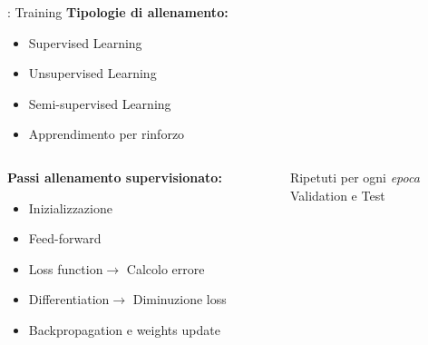 \documentclass[xcolor=x11names,compress, 
]{beamer}
\theoremstyle{definition} \newtheorem{esempio}{Esempio}
\theoremstyle{definition}
\begin{document}
		\begin{frame}{\subsecname: Training}
				\textbf{Tipologie di allenamento:}
				\begin{itemize}
					\item Supervised Learning\pause
					\item Unsupervised Learning\pause
					\item Semi-supervised Learning\pause
					\item Apprendimento per rinforzo
				\end{itemize}\pause
			\begin{columns}
				\begin{column}{0.7\textwidth}
					\textbf{Passi allenamento supervisionato:}
					\begin{itemize}
						\item Inizializzazione\pause
						\item Feed-forward\pause
						\item Loss function\pause $\rightarrow$ Calcolo errore\pause
						\item Differentiation\pause $\rightarrow$ Diminuzione loss\pause
						\item Backpropagation e weights update
					\end{itemize}\pause
				\end{column}
				\begin{column}{0.3\textwidth}
					\begin{center}
						Ripetuti per ogni \textit{epoca}\\
						Validation e Test
					\end{center}
				\end{column}
			\end{columns}
		\end{frame}
	
\end{document}
